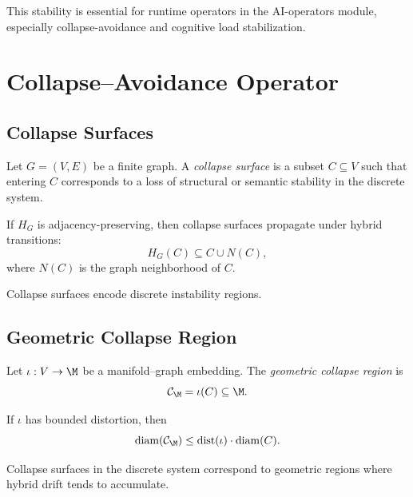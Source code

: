 \begin{remark}
This stability is essential for runtime operators in the AI-operators
module, especially collapse-avoidance and cognitive load stabilization.
\end{remark}

\section{Collapse--Avoidance Operator}

\subsection{Collapse Surfaces}

\begin{definition}
Let $G = (V,E)$ be a finite graph.  
A \emph{collapse surface} is a subset $C \subseteq V$ such that entering
$C$ corresponds to a loss of structural or semantic stability in the
discrete system.
\end{definition}

\begin{lemma}
If $H_G$ is adjacency-preserving, then collapse surfaces propagate under
hybrid transitions:
\[
H_G(C) \subseteq C \cup N(C),
\]
where $N(C)$ is the graph neighborhood of $C$.
\end{lemma}

\begin{remark}
Collapse surfaces encode discrete instability regions.
\end{remark}

\subsection{Geometric Collapse Region}

\begin{definition}
Let $\iota : V \to \M$ be a manifold--graph embedding.  
The \emph{geometric collapse region} is
\[
\mathcal{C}_\M = \iota(C) \subseteq \M.
\]
\end{definition}

\begin{lemma}
If $\iota$ has bounded distortion, then
\[
\mathrm{diam}(\mathcal{C}_\M)
\le \mathrm{dist}(\iota) \cdot \mathrm{diam}(C).
\]
\end{lemma}

\begin{remark}
Collapse surfaces in the discrete system correspond to geometric regions
where hybrid drift tends to accumulate.
\end{remark}

